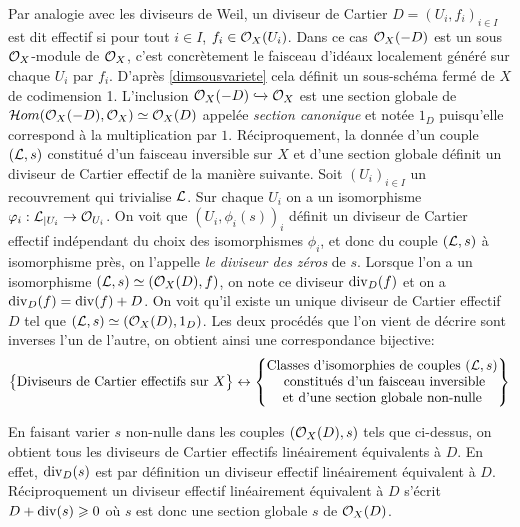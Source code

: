 Par analogie avec les diviseurs de Weil, un diviseur de Cartier $D=(U_i, f_i)_{i\in I}$ est dit effectif si pour tout $i\in I$, $f_i\in \mathcal{O}_X(U_i)$. Dans ce cas $\mathcal{O}_X(-D)$ est un sous $\mathcal{O}_X$-module de $\mathcal{O}_X$, c'est concrètement le faisceau d'idéaux localement généré sur chaque $U_i$ par $f_i$. D'après \ref{dimsousvariete} cela définit un sous-schéma fermé de $X$ de codimension 1. L'inclusion $\mathcal{O}_X(-D)\xhookrightarrow{} \mathcal{O}_X$ est une section globale de $\mathcal{H} om(\mathcal{O}_X(-D), \mathcal{O}_X)\simeq \mathcal{O}_X(D)$ appelée \textit{section canonique} et notée $1_D$ puisqu'elle correspond à la multiplication par $1$. Réciproquement, la donnée d'un couple $(\mathcal{L}, s)$ constitué d'un faisceau inversible sur $X$ et d'une section globale définit un diviseur de Cartier effectif de la manière suivante. Soit $(U_i)_{i\in I}$ un recouvrement qui trivialise $\mathcal{L}$. Sur chaque $U_i$ on a un isomorphisme $\varphi_i:\mathcal{L}_{|U_i}\rightarrow\mathcal{O}_{U_i}$. On voit que $(U_i,\phi_i(s))_i$ définit un diviseur de Cartier effectif indépendant du choix des isomorphismes $\phi_i$, et donc du couple $(\mathcal{L},s)$ à isomorphisme près, on l'appelle \textit{le diviseur des zéros} de $s$. Lorsque l'on a un isomorphisme $(\mathcal{L},s)\simeq (\mathcal{O}_X(D),f)$, on note ce diviseur $\operatorname{div}_D(f)$ et on a $\operatorname{div}_D(f)=\operatorname{div}(f)+D$. On voit qu'il existe un unique diviseur de Cartier effectif $D$ tel que $(\mathcal{L},s)\simeq(\mathcal{O}_X(D),1_D)$. Les deux procédés que l'on vient de décrire sont inverses l'un de l'autre, on obtient ainsi une correspondance bijective:
$$
\left\{
\begin{matrix}
\text{Diviseurs de Cartier effectifs sur }X
\end{matrix}
\right\}
\leftrightarrow
\left\{
\begin{matrix}
\text{Classes d'isomorphies de couples }(\mathcal{L}, s)\\
\text{ constitués d'un faisceau inversible}\\
\text{et d'une section globale non-nulle}
\end{matrix}
\right\}
$$

En faisant varier $s$ non-nulle dans les couples $(\mathcal{O}_X(D),s)$ tels que ci-dessus, on obtient tous les diviseurs de Cartier effectifs linéairement équivalents à $D$. En effet, $\operatorname{div}_D(s)$ est par définition un diviseur effectif linéairement équivalent à $D$. Réciproquement un diviseur effectif linéairement équivalent à $D$ s'écrit $D+\operatorname{div}(s)\geqslant 0$ où $s$ est donc une section globale $s$ de $\mathcal{O}_X(D)$.

